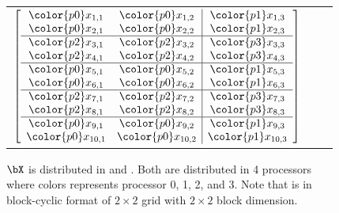 \begin{figure}
\begin{center}
\begin{tabular}{ccc}
$
\left[
\begin{array}{cc|c}
\color{p0}x_{1,1} & \color{p0}x_{1,2} & \color{p1}x_{1,3} \\
\color{p0}x_{2,1} & \color{p0}x_{2,2} & \color{p1}x_{2,3} \\ \hline
\color{p2}x_{3,1} & \color{p2}x_{3,2} & \color{p3}x_{3,3} \\
\color{p2}x_{4,1} & \color{p2}x_{4,2} & \color{p3}x_{4,3} \\ \hline
\color{p0}x_{5,1} & \color{p0}x_{5,2} & \color{p1}x_{5,3} \\
\color{p0}x_{6,1} & \color{p0}x_{6,2} & \color{p1}x_{6,3} \\ \hline
\color{p2}x_{7,1} & \color{p2}x_{7,2} & \color{p3}x_{7,3} \\
\color{p2}x_{8,1} & \color{p2}x_{8,2} & \color{p3}x_{8,3} \\ \hline
\color{p0}x_{9,1} & \color{p0}x_{9,2} & \color{p1}x_{9,3} \\
\color{p0}x_{10,1} & \color{p0}x_{10,2} & \color{p1}x_{10,3} \\
\end{array}
\right]
$
\end{tabular}
\end{center}
\caption{
$\bX$ is distributed in
 and .
Both are distributed in 4 processors
where colors represents processor {\color{p0}0},
{\color{p1}1}, {\color{p2}2}, and {\color{p3}3}.
Note that  is in block-cyclic format of
$2\times 2$ grid with $2\times 2$ block dimension.
}
\end{figure}
